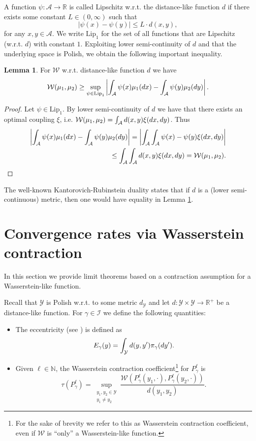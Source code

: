 \documentclass[12pt]{article}
\theoremstyle{definition}
\newtheorem{lem}[thm]{Lemma}
\renewcommand{\d}{{\rm d}}
\newcommand{\N}{\mathbb{N}}
\newcommand{\R}{\mathbb{R}}
\newcommand{\cY}{\mathcal{Y}}
\newcommand{\cA}{\mathcal{A}}
\begin{document}
A function $\psi \colon \cA \to \R$ is called Lipschitz w.r.t. the distance-like function $d$ if there exists some constant $L \in (0, \infty)$ such that  
	\[
	\vert \psi(x) - \psi(y) \vert \leq L \cdot  d(x,y),
	\]
	for any $x,y \in \cA$.
We write $\text{Lip}_1$ for the set of all functions that are Lipschitz (w.r.t. $d$) with constant $1$. 
Exploiting lower semi-continuity of $d$ and that the underlying space is Polish, we obtain the following important inequality.
\begin{lem}\label{lem:duality_inequality}
	For $\mathcal{W}$ w.r.t. distance-like function $d$ we have
	\[
	\mathcal{W}(\mu_1, \mu_2) \geq \sup_{\psi \in \text{Lip}_1} \left\vert  \int_\cA \psi(x) \mu_1(\d x) - \int_\cA \psi(y) \mu_2(\d y)  \right\vert.
	\]
\end{lem}
\begin{proof}
	Let $\psi \in \text{Lip}_1$. 
	By lower semi-continuity of $d$ we have that there exists an optimal coupling $\xi$, i.e. $\mathcal{W}(\mu_1,\mu_2) =  \int_\cA d(x,y) \xi(\d x, \d y)$.  
	Thus 
	\begin{align*}
		\left\vert \int_\cA \psi(x) \mu_1(\d x) - \int_\cA \psi(y) \mu_2(\d y)  \right\vert
		=
		\left\vert\int_\cA\int_\cA \psi(x)  -  \psi(y) \xi(\d x ,\d y)  \right\vert\\
		\leq 
		\int_\cA\int_\cA d(x,y) \xi(\d x,\d y) = \mathcal{W}(\mu_1, \mu_2).  
	\end{align*}
\end{proof}
The well-known Kantorovich-Rubinstein duality states that if $d$ is a (lower semi-continuous) metric, then one would have equality in Lemma \ref{lem:duality_inequality}.


\section{Convergence rates via Wasserstein contraction}\label{sec:Wasserstein_theory}
In this section we provide limit theorems based on a contraction assumption for a Wasserstein-like function. 

Recall that $\cY$ is Polish w.r.t. to some metric $d_\cY$ and let $d \colon \cY \times \cY \to \R^+$ be a distance-like function.
For $\gamma \in \mathcal{I}$ we define the following quantities: 
\begin{itemize}
	\item[1)] The eccentricity (see \cite{Joulin2010Curvature}) is defined as 
	\[
	E_\gamma (y) = \int_\cY d(y, y' ) \pi_\gamma(\d y').
	\] 
	\item[2)] Given $\ell \in \N$, the Wasserstein contraction coefficient\footnote{For the sake of brevity we refer to this as Wasserstein contraction coefficient, even if $\mathcal{W}$ is ``only'' a Wasserstein-like function.} for $P_\gamma^\ell$ is 
	\[
	\tau(P_\gamma^\ell) = \sup_{\substack{y_1, y_2 \in \cY\\y_1 \neq y_2}} \frac{\mathcal{W} (P_\gamma^\ell (y_1, \cdot ), P_\gamma^\ell(y_2, \cdot))}{d(y_1, y_2)}.
	\]
\end{itemize}
\end{document}
